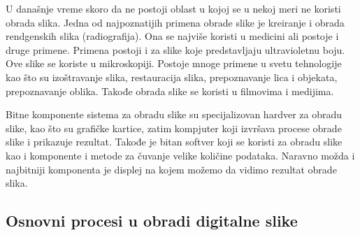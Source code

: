 \documentclass[a4paper,12pt,titlepage]{article}
\begin{document}
U današnje vreme skoro da ne postoji oblast u kojoj se u nekoj meri ne koristi obrada slika. Jedna od najpoznatijih primena obrade slike je kreiranje i obrada rendgenskih slika (radiografija). Ona se najviše koristi u medicini ali postoje i druge primene. Primena postoji i za slike koje predstavljaju ultravioletnu boju. Ove slike se koriste u mikroskopiji. Postoje mnoge primene u svetu tehnologije kao što su izoštravanje slika, restauracija slika, prepoznavanje lica i objekata, prepoznavanje oblika. Takođe obrada slike se koristi u filmovima i medijima.  

Bitne komponente sistema za obradu slike su specijalizovan hardver za obradu slike, kao što su grafičke kartice, zatim kompjuter koji izvršava procese obrade slike i prikazuje rezultat. Takođe je bitan softver koji se koristi za obradu slike kao i komponente i metode za čuvanje velike količine podataka. Naravno možda i najbitniji komponenta je displej na kojem možemo da vidimo rezultat obrade slika.            

\subsection{Osnovni procesi u obradi digitalne slike}%
\end{document}
